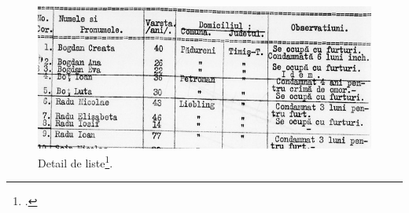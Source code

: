 \documentclass[a4paper,12pt,twoside]{book}
\begin{document}
                \begin{figure}[!ht]
        			\centering
                    \includegraphics[width=13cm]{images/rg_25_050m_0010_00000344_detail.jpg}
                    \caption{Detail de liste\footcite[Liste de l'inspection de la gendarmerie de Timișoara~:][Copyright \textit{Arhivele Naţionale ale României}]{rg-25.050mfileid:45931SelectedRecordsVarious}.}
                    \label{fig12}
                \end{figure}
                \vspace{-2em}
                
\end{document}
